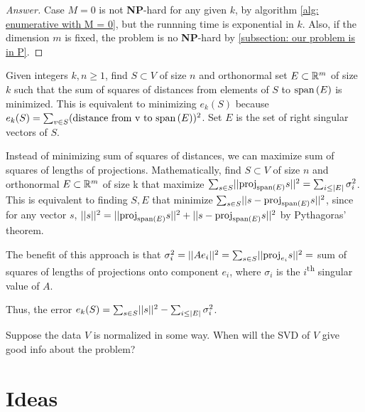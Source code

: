 \documentclass{article}
\begin{document}
\begin{proof}[Answer]
Case $M=0$ is not \textbf{NP}-hard for any given $k$, by algorithm \ref{alg: enumerative with M = 0}, but the runnning time is exponential in $k$. Also, if the dimension $m$ is fixed, the problem is no \textbf{NP}-hard by \ref{subsection: our problem is in P}.
\end{proof}

\begin{question}
\label{Q: geometric question}
    Given integers $k,n\geq 1$, find $S\subset V$ of size $n$ and orthonormal set $E\subset \mathbb{R}^m$ of size $k$ such that the sum of squares of distances from elements of $S$ to $\text{span}\left(E\right)$ is minimized. This is equivalent to minimizing $e_k(S)$ because $e_k(S) = \sum_{v\in S}(\text{distance from v to $\text{span}\left(E\right)$})^2$. Set $E$ is the set of right singular vectors of $S$.
\end{question}

\begin{question}\label{Q: geometric question 2}
    Instead of minimizing sum of squares of distances, we can maximize sum of squares of lengths of projections. Mathematically, find $S\subset V$ of size $n$ and orthonormal $E\subset \mathbb{R}^m$ of size k that maximize $\sum_{s\in S} \norm{\proj_{\vspan{E}}s}^2 = \sum_{i\leq |E|}\sigma_i^2$. This is equivalent to finding $S,E$ that minimize $\sum_{s\in S} \norm{s-\proj_{\vspan{E}}s}^2$, since for any vector $s$, $||s||^2 = ||\text{proj}_{\text{span}\left(E\right)}s||^2 + ||s-\text{proj}_{\text{span}\left(E\right)}s||^2$ by Pythagoras' theorem.
    
    The benefit of this approach is that $\sigma_i^2 = \norm{Ae_i}^2 = \sum_{s\in S} \norm{\proj_{e_i}s}^2=$ sum of squares of lengths of projections onto component $e_i$, where $\sigma_i$ is the $i$\textsuperscript{th} singular value of $A$.
    
    Thus, the error $e_k(S) = \sum_{s\in S}\norm{s}^2 - \sum_{i\leq |E|}\sigma_i^2$.
\end{question}



\begin{question}
    Suppose the data $V$ is normalized in some way. When will the SVD of $V$ give good info about the problem?
\end{question}

\section{Ideas}
\end{document}
